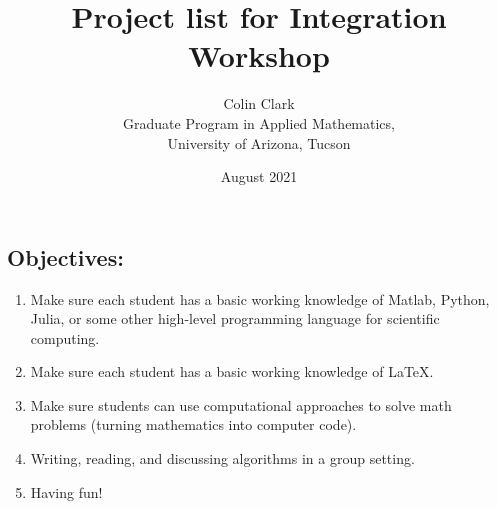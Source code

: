 \documentclass[11pt,oneside]{article}
\title{ Project list for Integration Workshop}
\author{Colin Clark \\  Graduate Program in Applied Mathematics,\\ University of Arizona, Tucson}
\date{August 2021}
\theoremstyle{definition}
\theoremstyle{definition}
\theoremstyle{remark}
\numberwithin{equation}{section}
\begin{document}
\maketitle


\subsection*{Objectives:}
\begin{enumerate}
\item Make sure each student has a basic working knowledge of Matlab, Python, Julia, or some other high-level programming language for scientific computing.
\item Make sure each student has a basic working knowledge of \LaTeX.
\item Make sure students can use computational approaches to solve math problems (turning mathematics into computer code).
\item Writing, reading, and discussing algorithms in a group setting.
\item Having fun!
\end{enumerate}

\newpage


\newpage


\newpage


\newpage


\newpage


\newpage


\newpage


\newpage


\newpage
\end{document}
